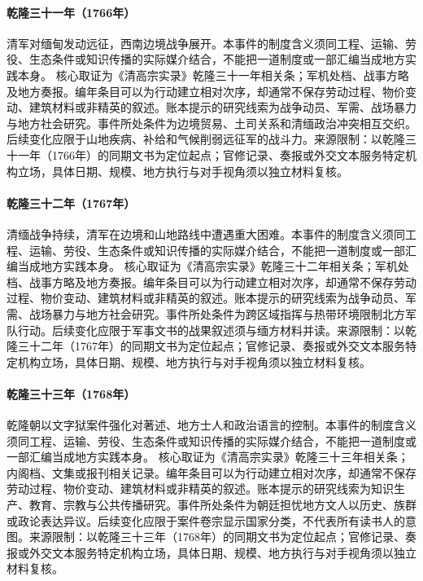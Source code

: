 \hypertarget{civic:EQ-1766-BURMA-WAR-BEGIN}{}\paragraph{乾隆三十一年（1766年）}清军对缅甸发动远征，西南边境战争展开。本事件的制度含义须同工程、运输、劳役、生态条件或知识传播的实际媒介结合，不能把一道制度或一部汇编当成地方实践本身。 核心取证为《清高宗实录》乾隆三十一年相关条；军机处档、战事方略及地方奏报。编年条目可以为行动建立相对次序，却通常不保存劳动过程、物价变动、建筑材料或非精英的叙述。账本提示的研究线索为战争动员、军需、战场暴力与地方社会研究。事件所处条件为边境贸易、土司关系和清缅政治冲突相互交织。后续变化应限于山地疾病、补给和气候削弱远征军的战斗力。来源限制：以乾隆三十一年（1766年）的同期文书为定位起点；官修记录、奏报或外交文本服务特定机构立场，具体日期、规模、地方执行与对手视角须以独立材料复核。
\hypertarget{civic:EQ-1767-BURMA-CAMPAIGN}{}\paragraph{乾隆三十二年（1767年）}清缅战争持续，清军在边境和山地路线中遭遇重大困难。本事件的制度含义须同工程、运输、劳役、生态条件或知识传播的实际媒介结合，不能把一道制度或一部汇编当成地方实践本身。 核心取证为《清高宗实录》乾隆三十二年相关条；军机处档、战事方略及地方奏报。编年条目可以为行动建立相对次序，却通常不保存劳动过程、物价变动、建筑材料或非精英的叙述。账本提示的研究线索为战争动员、军需、战场暴力与地方社会研究。事件所处条件为跨区域指挥与热带环境限制北方军队行动。后续变化应限于军事文书的战果叙述须与缅方材料并读。来源限制：以乾隆三十二年（1767年）的同期文书为定位起点；官修记录、奏报或外交文本服务特定机构立场，具体日期、规模、地方执行与对手视角须以独立材料复核。
\hypertarget{civic:EQ-1768-LITERARY-INQUISITION}{}\paragraph{乾隆三十三年（1768年）}乾隆朝以文字狱案件强化对著述、地方士人和政治语言的控制。本事件的制度含义须同工程、运输、劳役、生态条件或知识传播的实际媒介结合，不能把一道制度或一部汇编当成地方实践本身。 核心取证为《清高宗实录》乾隆三十三年相关条；内阁档、文集或报刊相关记录。编年条目可以为行动建立相对次序，却通常不保存劳动过程、物价变动、建筑材料或非精英的叙述。账本提示的研究线索为知识生产、教育、宗教与公共传播研究。事件所处条件为朝廷担忧地方文人以历史、族群或政论表达异议。后续变化应限于案件卷宗显示国家分类，不代表所有读书人的意图。来源限制：以乾隆三十三年（1768年）的同期文书为定位起点；官修记录、奏报或外交文本服务特定机构立场，具体日期、规模、地方执行与对手视角须以独立材料复核。
